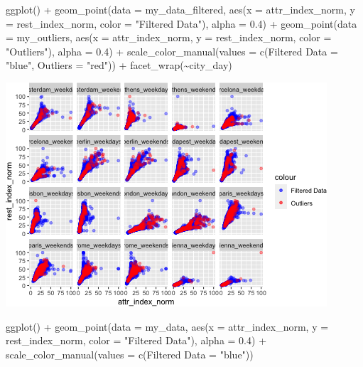 \documentclass[
]{article}
\newenvironment{Shaded}{\begin{snugshade}}{\end{snugshade}}
\newcommand{\AttributeTok}[1]{\textcolor[rgb]{0.77,0.63,0.00}{#1}}
\newcommand{\FloatTok}[1]{\textcolor[rgb]{0.00,0.00,0.81}{#1}}
\newcommand{\FunctionTok}[1]{\textcolor[rgb]{0.00,0.00,0.00}{#1}}
\newcommand{\NormalTok}[1]{#1}
\newcommand{\OtherTok}[1]{\textcolor[rgb]{0.56,0.35,0.01}{#1}}
\newcommand{\SpecialCharTok}[1]{\textcolor[rgb]{0.00,0.00,0.00}{#1}}
\newcommand{\StringTok}[1]{\textcolor[rgb]{0.31,0.60,0.02}{#1}}
\begin{document}
\begin{Shaded}
\begin{Highlighting}[]
\FunctionTok{ggplot}\NormalTok{() }\SpecialCharTok{+} \FunctionTok{geom\_point}\NormalTok{(}\AttributeTok{data =}\NormalTok{ my\_data\_filtered, }\FunctionTok{aes}\NormalTok{(}\AttributeTok{x =}\NormalTok{ attr\_index\_norm,}
    \AttributeTok{y =}\NormalTok{ rest\_index\_norm, }\AttributeTok{color =} \StringTok{"Filtered Data"}\NormalTok{), }\AttributeTok{alpha =} \FloatTok{0.4}\NormalTok{) }\SpecialCharTok{+}
    \FunctionTok{geom\_point}\NormalTok{(}\AttributeTok{data =}\NormalTok{ my\_outliers, }\FunctionTok{aes}\NormalTok{(}\AttributeTok{x =}\NormalTok{ attr\_index\_norm, }\AttributeTok{y =}\NormalTok{ rest\_index\_norm,}
        \AttributeTok{color =} \StringTok{"Outliers"}\NormalTok{), }\AttributeTok{alpha =} \FloatTok{0.4}\NormalTok{) }\SpecialCharTok{+} \FunctionTok{scale\_color\_manual}\NormalTok{(}\AttributeTok{values =} \FunctionTok{c}\NormalTok{(}\StringTok{\textasciigrave{}}\AttributeTok{Filtered Data}\StringTok{\textasciigrave{}} \OtherTok{=} \StringTok{"blue"}\NormalTok{,}
    \AttributeTok{Outliers =} \StringTok{"red"}\NormalTok{)) }\SpecialCharTok{+} \FunctionTok{facet\_wrap}\NormalTok{(}\SpecialCharTok{\textasciitilde{}}\NormalTok{city\_day)}
\end{Highlighting}
\end{Shaded}

\includegraphics{Project_files/figure-latex/unnamed-chunk-34-2.png}

\begin{Shaded}
\begin{Highlighting}[]
\FunctionTok{ggplot}\NormalTok{() }\SpecialCharTok{+} \FunctionTok{geom\_point}\NormalTok{(}\AttributeTok{data =}\NormalTok{ my\_data, }\FunctionTok{aes}\NormalTok{(}\AttributeTok{x =}\NormalTok{ attr\_index\_norm,}
    \AttributeTok{y =}\NormalTok{ rest\_index\_norm, }\AttributeTok{color =} \StringTok{"Filtered Data"}\NormalTok{), }\AttributeTok{alpha =} \FloatTok{0.4}\NormalTok{) }\SpecialCharTok{+}
    \FunctionTok{scale\_color\_manual}\NormalTok{(}\AttributeTok{values =} \FunctionTok{c}\NormalTok{(}\StringTok{\textasciigrave{}}\AttributeTok{Filtered Data}\StringTok{\textasciigrave{}} \OtherTok{=} \StringTok{"blue"}\NormalTok{))}
\end{Highlighting}
\end{Shaded}
\end{document}

